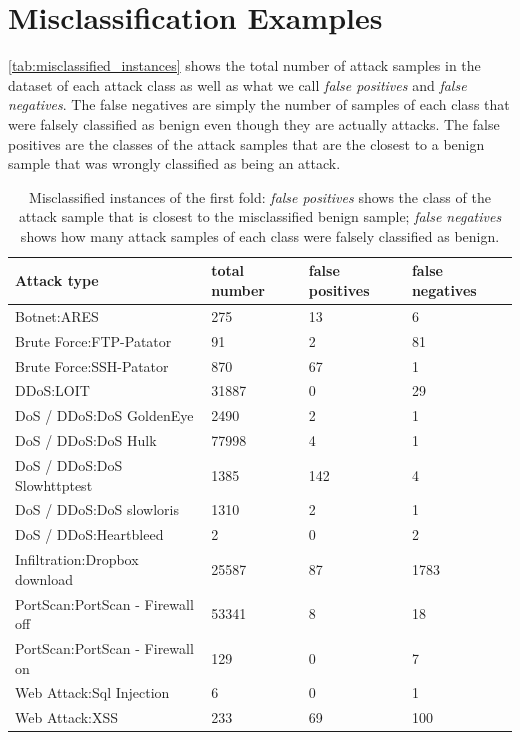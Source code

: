 \documentclass[10pt,sigconf,letterpaper,dvipsnames]{acmart}
\begin{document}
\section{Misclassification Examples}
\autoref{tab:misclassified_instances} shows the total number of attack samples in the dataset of each attack class as well as what we call \textit{false positives} and \textit{false negatives}. The false negatives are simply the number of samples of each class that were falsely classified as benign even though they are actually attacks.
The false positives are the classes of the attack samples that are the closest to a benign sample that was wrongly classified as being an attack.

\begin{table}
\caption{Misclassified instances of the first fold: \textit{false positives} shows the class of the attack sample that is closest to the misclassified benign sample; \textit{false negatives} shows how many attack samples of each class were falsely classified as benign.}
\label{tab:misclassified_instances}
\begin{tabular}{l l l l}
\toprule
Attack type & total number & false positives & false negatives \\
\midrule
Botnet:ARES  & 275 & 13 & 6 \\
Brute Force:FTP-Patator & 91 & 2 & 81 \\
Brute Force:SSH-Patator & 870 & 67 & 1 \\
DDoS:LOIT & 31887 & 0 & 29 \\
DoS / DDoS:DoS GoldenEye & 2490 & 2 & 1 \\
DoS / DDoS:DoS Hulk & 77998 & 4 & 1 \\
DoS / DDoS:DoS Slowhttptest & 1385 & 142 & 4 \\
DoS / DDoS:DoS slowloris & 1310 & 2 & 1 \\
DoS / DDoS:Heartbleed & 2 & 0 & 2 \\
Infiltration:Dropbox download & 25587 & 87 & 1783 \\
PortScan:PortScan - Firewall off & 53341 & 8 & 18 \\
PortScan:PortScan - Firewall on & 129 & 0 & 7 \\
Web Attack:Sql Injection & 6 & 0 & 1 \\
Web Attack:XSS & 233 & 69 & 100 \\
\bottomrule
\end{tabular}
\end{table}
\end{document}
